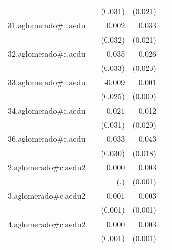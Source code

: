 {\begin{longtable}{l*{4}{D{.}{.}{-1}}}
            &                     &     (0.031)         &     (0.021)         &                     \\
\addlinespace
31.aglomerado#c.aedu&                     &       0.002         &       0.033         &                     \\
            &                     &     (0.032)         &     (0.021)         &                     \\
\addlinespace
32.aglomerado#c.aedu&                     &      -0.035         &      -0.026         &                     \\
            &                     &     (0.033)         &     (0.023)         &                     \\
\addlinespace
33.aglomerado#c.aedu&                     &      -0.009         &       0.001         &                     \\
            &                     &     (0.025)         &     (0.009)         &                     \\
\addlinespace
34.aglomerado#c.aedu&                     &      -0.021         &      -0.012         &                     \\
            &                     &     (0.031)         &     (0.020)         &                     \\
\addlinespace
36.aglomerado#c.aedu&                     &       0.033         &       0.043\sym{*}  &                     \\
            &                     &     (0.030)         &     (0.018)         &                     \\
\addlinespace
2.aglomerado#c.aedu2&                     &       0.000         &       0.003\sym{**} &                     \\
            &                     &         (.)         &     (0.001)         &                     \\
\addlinespace
3.aglomerado#c.aedu2&                     &       0.001         &       0.003\sym{**} &                     \\
            &                     &     (0.001)         &     (0.001)         &                     \\
\addlinespace
4.aglomerado#c.aedu2&                     &       0.000         &       0.003\sym{***}&                     \\
            &                     &     (0.001)         &     (0.001)         &                     \\

\end{longtable}}
